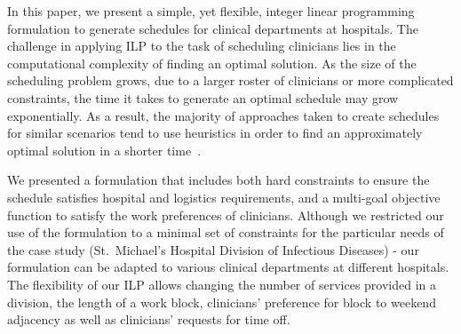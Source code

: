 In this paper, we present a simple, yet flexible, integer linear programming
formulation to generate schedules for clinical departments at hospitals.
The challenge in applying ILP to the task of scheduling clinicians lies in the
computational complexity of finding an optimal solution. As the size of the
scheduling problem grows, due to a larger roster of clinicians or more
complicated constraints, the time it takes to generate an optimal schedule may
grow exponentially.
As a result, the majority of approaches taken to create schedules for similar
scenarios tend to use heuristics in order to find an approximately optimal
solution in a shorter time~\cite{burke_state_2004}. %


We presented a formulation that includes both hard constraints to ensure the
schedule satisfies hospital and logistics requirements, and a multi-goal
objective function to satisfy the work preferences of clinicians.
Although we restricted our use of the formulation to a minimal set of
constraints for the particular needs of the case study (St.\ Michael's Hospital
Division of Infectious Diseases) - our formulation can be adapted to various
clinical departments at different hospitals. The flexibility of our ILP allows
changing the number of services provided in a division, the length of a work
block, clinicians' preference for block to weekend adjacency as well as
clinicians' requests for time off.

